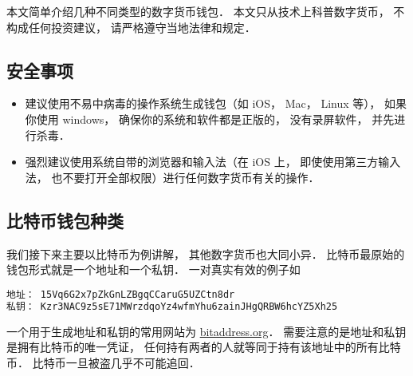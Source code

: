 
本文简单介绍几种不同类型的数字货币钱包． 本文只从技术上科普数字货币， 不构成任何投资建议， 请严格遵守当地法律和规定．

\subsection{安全事项}
\begin{itemize}
\item 建议使用不易中病毒的操作系统生成钱包（如 iOS， Mac， Linux 等）， 如果你使用 windows， 确保你的系统和软件都是正版的， 没有录屏软件， 并先进行杀毒．
\item 强烈建议使用系统自带的浏览器和输入法（在 iOS 上， 即使使用第三方输入法， 也不要打开全部权限）进行任何数字货币有关的操作．
\end{itemize}

\subsection{比特币钱包种类}
我们接下来主要以比特币为例讲解， 其他数字货币也大同小异． 比特币最原始的钱包形式就是一个地址和一个私钥． 一对真实有效的例子如
\begin{lstlisting}[language=bash]
地址： 15Vq6G2x7pZkGnLZBgqCCaruG5UZCtn8dr
私钥： Kzr3NAC9z5sE71MWrzdqoYz4wfmYhu6zainJHgQRBW6hcYZ5Xh25
\end{lstlisting}
一个用于生成地址和私钥的常用网站为 \href{https://www.bitaddress.org/}{bitaddress.org}． 需要注意的是地址和私钥是拥有比特币的唯一凭证， 任何持有两者的人就等同于持有该地址中的所有比特币． 比特币一旦被盗几乎不可能追回．

